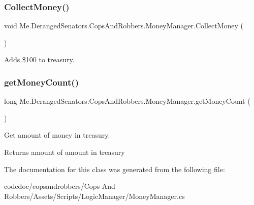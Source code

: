 \subsubsection{\texorpdfstring{Collect\+Money()}{CollectMoney()}}
{\footnotesize\ttfamily void Me.\+Deranged\+Senators.\+Cops\+And\+Robbers.\+Money\+Manager.\+Collect\+Money (\begin{DoxyParamCaption}{ }\end{DoxyParamCaption})\hspace{0.3cm}{\ttfamily [inline]}}



Adds \$100 to treasury. 

\mbox{\label{classMe_1_1DerangedSenators_1_1CopsAndRobbers_1_1MoneyManager_ae3add7d4d516daeed1a95f866e116b45}} 
\subsubsection{\texorpdfstring{get\+Money\+Count()}{getMoneyCount()}}
{\footnotesize\ttfamily long Me.\+Deranged\+Senators.\+Cops\+And\+Robbers.\+Money\+Manager.\+get\+Money\+Count (\begin{DoxyParamCaption}{ }\end{DoxyParamCaption})\hspace{0.3cm}{\ttfamily [inline]}}



Get amount of money in treasury. 

\begin{DoxyReturn}{Returns}
amount of amount in treasury
\end{DoxyReturn}


The documentation for this class was generated from the following file\+:\begin{DoxyCompactItemize}
\item 
codedoc/copsandrobbers/\+Cops And Robbers/\+Assets/\+Scripts/\+Logic\+Manager/Money\+Manager.\+cs\end{DoxyCompactItemize}
